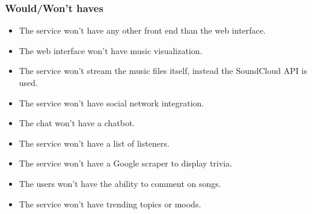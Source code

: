 \subsubsection{Would/Won't haves}
\begin{itemize}
\item The service won't have any other front end than the web interface.

\item The web interface won't have music visualization.

\item The service won't stream the music files itself, instead the SoundCloud API is used.

\item The service won't have social network integration.

\item The chat won't have a chatbot.

\item The service won't have a list of listeners.

\item The service won't have a Google scraper to display trivia.

\item The users won't have the ability to comment on songs.

\item The service won't have trending topics or moods.

\end{itemize}

